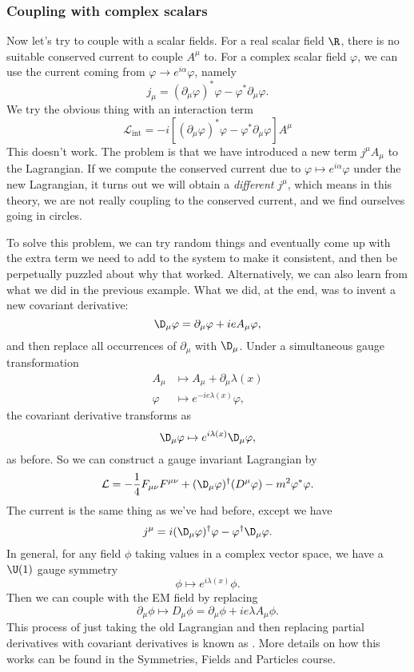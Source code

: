 \documentclass[a4paper]{article}
\begin{document}
\subsubsection*{Coupling with complex scalars}
Now let's try to couple with a scalar fields. For a real scalar field $\R$, there is no suitable conserved current to couple $A^\mu$ to. For a complex scalar field $\varphi$, we can use the current coming from $\varphi \to e^{i\alpha} \varphi$, namely
\[
  j_\mu = (\partial_\mu \varphi)^* \varphi - \varphi^* \partial_\mu \varphi.
\]
We try the obvious thing with an interaction term
\[
  \mathcal{L}_{\mathrm{int}} = -i [(\partial_\mu \varphi)^* \varphi - \varphi^* \partial_\mu \varphi] A^\mu
\]
This doesn't work. The problem is that we have introduced a new term $j^\mu A_\mu$ to the Lagrangian. If we compute the conserved current due to $\varphi \mapsto e^{i\alpha} \varphi$ under the new Lagrangian, it turns out we will obtain a \emph{different} $j^\mu$, which means in this theory, we are not really coupling to the conserved current, and we find ourselves going in circles.

To solve this problem, we can try random things and eventually come up with the extra term we need to add to the system to make it consistent, and then be perpetually puzzled about why that worked. Alternatively, we can also learn from what we did in the previous example. What we did, at the end, was to invent a new covariant derivative:
\[
  \D_\mu \varphi = \partial_\mu \varphi + ie A_\mu \varphi,
\]
and then replace all occurrences of $\partial_\mu$ with $\D_\mu$. Under a simultaneous gauge transformation
\begin{align*}
  A_\mu &\mapsto A_\mu + \partial_\mu \lambda(x)\\
  \varphi &\mapsto e^{-ie \lambda(x)} \varphi,
\end{align*}
the covariant derivative transforms as
\[
  \D_\mu \varphi \mapsto e^{i\lambda(x)} \D_\mu \varphi,
\]
as before. So we can construct a gauge invariant Lagrangian by
\[
  \mathcal{L} = -\frac{1}{4} F_{\mu\nu}F^{\mu\nu} + (\D_\mu \varphi)^\dagger (D^\mu \varphi) - m^2 \varphi^* \varphi.
\]
The current is the same thing as we've had before, except we have
\[
  j^\mu = i(\D_\mu \varphi)^\dagger \varphi - \varphi^\dagger \D_\mu \varphi.
\]
In general, for any field $\phi$ taking values in a complex vector space, we have a $\U(1)$ gauge symmetry
\[
  \phi \mapsto e^{i\lambda(x)} \phi.
\]
Then we can couple with the EM field by replacing
\[
  \partial_\mu \phi \mapsto D_\mu \phi = \partial_\mu \phi+ ie \lambda A_\mu \phi.
\]
This process of just taking the old Lagrangian and then replacing partial derivatives with covariant derivatives is known as . More details on how this works can be found in the Symmetries, Fields and Particles course.
\end{document}
